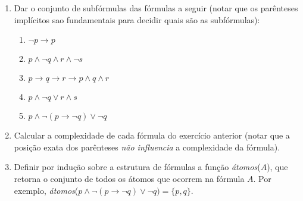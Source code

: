 \documentclass[12pt,a4paper,oneside]{article}
\begin{document}
\begin{enumerate}
	\item Dar o conjunto de subfórmulas das fórmulas a seguir (notar que os parênteses implícitos sao fundamentais para decidir quais são as subfórmulas):	
	
		\begin{enumerate}
			\item $\neg p \rightarrow p$
			\item $p \wedge \neg q \wedge r \wedge \neg s$ 
			\item $p \rightarrow q \rightarrow r \rightarrow p \wedge q \wedge r$
			\item $p \wedge \neg q \vee r \wedge s$
			\item $p \wedge \neg (p \rightarrow \neg q) \vee \neg q$
		\end{enumerate}
		
	\item Calcular a complexidade de cada fórmula do exercício anterior (notar que a posição exata dos parênteses {\it não influencia} a complexidade da fórmula).
	
	\item Definir por indução sobre a estrutura de fórmulas a função {\it átomos}($A$), que retorna o conjunto de todos os átomos que ocorrem na fórmula $A$. Por exemplo, {\it átomos}($p \wedge \neg (p \rightarrow \neg q) \vee \neg q) = \{p,q\}$.
	
%	
		

\end{enumerate}
\end{document}
